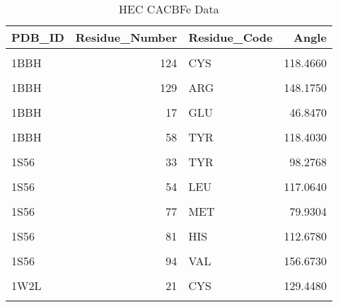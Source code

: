 	\begin{table}
		\caption{HEC CACBFe Data}
		\label{tbl:HEC_cab}
		\centering
		\begin{tabular}{lrlr}
			\toprule
			PDB\_ID & Residue\_Number & Residue\_Code & Angle\\
			\midrule
			\cellcolor{gray!6}{1BBH} & \cellcolor{gray!6}{121} & \cellcolor{gray!6}{CYS} & \cellcolor{gray!6}{88.6062}\\
			1BBH & 124 & CYS & 118.4660\\
			\cellcolor{gray!6}{1BBH} & \cellcolor{gray!6}{125} & \cellcolor{gray!6}{HIS} & \cellcolor{gray!6}{95.2502}\\
			1BBH & 129 & ARG & 148.1750\\
			\cellcolor{gray!6}{1BBH} & \cellcolor{gray!6}{16} & \cellcolor{gray!6}{TYR} & \cellcolor{gray!6}{126.0380}\\
			\addlinespace
			1BBH & 17 & GLU & 46.8470\\
			\cellcolor{gray!6}{1BBH} & \cellcolor{gray!6}{19} & \cellcolor{gray!6}{MET} & \cellcolor{gray!6}{132.1620}\\
			1BBH & 58 & TYR & 118.4030\\
			\cellcolor{gray!6}{1S56} & \cellcolor{gray!6}{126} & \cellcolor{gray!6}{VAL} & \cellcolor{gray!6}{116.6120}\\
			1S56 & 33 & TYR & 98.2768\\
			\addlinespace
			\cellcolor{gray!6}{1S56} & \cellcolor{gray!6}{46} & \cellcolor{gray!6}{PHE} & \cellcolor{gray!6}{100.7840}\\
			1S56 & 54 & LEU & 117.0640\\
			\cellcolor{gray!6}{1S56} & \cellcolor{gray!6}{58} & \cellcolor{gray!6}{GLN} & \cellcolor{gray!6}{114.9080}\\
			1S56 & 77 & MET & 79.9304\\
			\cellcolor{gray!6}{1S56} & \cellcolor{gray!6}{80} & \cellcolor{gray!6}{VAL} & \cellcolor{gray!6}{122.1110}\\
			\addlinespace
			1S56 & 81 & HIS & 112.6780\\
			\cellcolor{gray!6}{1S56} & \cellcolor{gray!6}{86} & \cellcolor{gray!6}{ILE} & \cellcolor{gray!6}{163.7880}\\
			1S56 & 94 & VAL & 156.6730\\
			\cellcolor{gray!6}{1W2L} & \cellcolor{gray!6}{18} & \cellcolor{gray!6}{CYS} & \cellcolor{gray!6}{83.0319}\\
			1W2L & 21 & CYS & 129.4480\\
			\addlinespace

\end{tabular}
\end{table}
